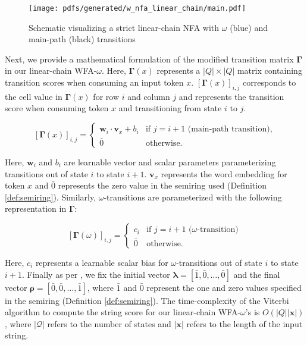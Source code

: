 \begin{figure}[t!]
  \centering
  \texttt{[image: pdfs/generated/w\_nfa\_linear\_chain/main.pdf]}
  \caption{Schematic visualizing a strict linear-chain NFA with
    $\omega$ (blue) and main-path (black) transitions}
  \label{fig:omega_fa}
\end{figure}

Next, we provide a mathematical formulation of the modified transition matrix
$\bm{\Gamma}$ in our linear-chain WFA-$\omega$. Here, $\bm{\Gamma}(x)$ represents a
$|Q|\times|Q|$ matrix containing transition scores when consuming an input token
$x$. $[\bm{\Gamma}(x)]_{i,j}$ corresponds to the cell value in $\bm{\Gamma}(x)$ for row
$i$ and column $j$ and represents the transition score when consuming token $x$
and transitioning from state $i$ to $j$.

\begin{equation}
  \label{eq:spp_transition_matrix_main}
  [\bm{\Gamma}(x)]_{i,j} =
  \begin{cases}
    \bm{w}_i \cdot \bm{v}_x + b_i  & \text{if } j = i + 1 \text{ (main-path transition),} \\
    \bar{0} & \text{otherwise.}
  \end{cases}
\end{equation}

Here, $\bm{w}_i$ and $b_i$ are learnable vector and scalar parameters
parameterizing transitions out of state $i$ to state $i+1$. $\bm{v}_x$
represents the word embedding for token $x$ and $\bar{0}$ represents the zero
value in the semiring used (Definition \ref{def:semiring}). Similarly,
$\omega$-transitions are parameterized with the following representation in
$\bm{\Gamma}$:

\begin{equation}
  \label{eq:spp_transition_matrix_omega}
  [\bm{\Gamma}(\omega)]_{i,j} =
  \begin{cases}
    c_i  & \text{if } j = i + 1 \text{ ($\omega$-transition)} \\
    \bar{0} & \text{otherwise.}
  \end{cases}
\end{equation}

Here, $c_i$ represents a learnable scalar bias for $\omega$-transitions out of
state $i$ to state $i+1$. Finally as per \citet{schwartz2018sopa}, we fix the
initial vector $\bm{\lambda} = [\bar{1}, \bar{0}, \ldots, \bar{0}]$ and the final
vector $\bm{\rho} = [\bar{0}, \bar{0}, \ldots, \bar{1}]$, where $\bar{1}$ and
$\bar{0}$ represent the one and zero values specified in the semiring
(Definition \ref{def:semiring}). The time-complexity of the Viterbi algorithm to
compute the string score for our linear-chain WFA-$\omega$'s is
$O(|Q||\bm{x}|)$, where $|\mathcal{Q}|$ refers to the number of states and
$|\bm{x}|$ refers to the length of the input string.

